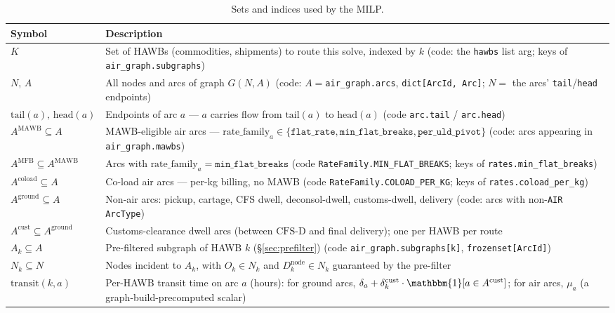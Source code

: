 \documentclass[11pt,a4paper]{article}
\theoremstyle{definition}
\begin{document}
\begin{table}[H]
\centering
\caption{Sets and indices used by the MILP.}
\label{tab:sets-indices}
\begin{tabular}{lp{11.5cm}}
\toprule
Symbol & Description \\
\midrule
$K$ & Set of HAWBs (commodities, shipments) to route this solve, indexed by $k$ (code: the \texttt{hawbs} list arg; keys of \texttt{air\_graph.subgraphs}) \\
$N,\, A$ & All nodes and arcs of graph $G(N,A)$ (code: $A=$\texttt{air\_graph.arcs}, \texttt{dict[ArcId, Arc]}; $N=$ the arcs' \texttt{tail}/\texttt{head} endpoints) \\
$\text{tail}(a),\, \text{head}(a)$ & Endpoints of arc $a$ --- $a$ carries flow from $\text{tail}(a)$ to $\text{head}(a)$ (code \texttt{arc.tail} / \texttt{arc.head}) \\
$A^{\text{MAWB}} \subseteq A$ & MAWB-eligible air arcs --- $\text{rate\_family}_a \in \{\texttt{flat\_rate}, \texttt{min\_flat\_breaks}, \texttt{per\_uld\_pivot}\}$ (code: arcs appearing in \texttt{air\_graph.mawbs}) \\
$A^{\text{MFB}} \subseteq A^{\text{MAWB}}$ & Arcs with $\text{rate\_family}_a = \texttt{min\_flat\_breaks}$ (code \texttt{RateFamily.MIN\_FLAT\_BREAKS}; keys of \texttt{rates.min\_flat\_breaks}) \\
$A^{\text{coload}} \subseteq A$ & Co-load air arcs --- per-kg billing, no MAWB (code \texttt{RateFamily.COLOAD\_PER\_KG}; keys of \texttt{rates.coload\_per\_kg}) \\
$A^{\text{ground}} \subseteq A$ & Non-air arcs: pickup, cartage, CFS dwell, deconsol-dwell, customs-dwell, delivery (code: arcs with non-\texttt{AIR} \texttt{ArcType}) \\
$A^{\text{cust}} \subseteq A^{\text{ground}}$ & Customs-clearance dwell arcs (between $\text{CFS-D}$ and final delivery); one per HAWB per route \\
$A_k \subseteq A$ & Pre-filtered subgraph of HAWB $k$ (\S\ref{sec:prefilter}) (code \texttt{air\_graph.subgraphs[k]}, \texttt{frozenset[ArcId]}) \\
$N_k \subseteq N$ & Nodes incident to $A_k$, with $O_k \in N_k$ and $D_k^{\text{node}} \in N_k$ guaranteed by the pre-filter \\
$\text{transit}(k, a)$ & Per-HAWB transit time on arc $a$ (hours): for ground arcs, $\delta_a + \delta^{\text{cust}}_k \cdot \mathbbm{1}[a \in A^{\text{cust}}]$; for air arcs, $\mu_a$ (a graph-build-precomputed scalar) \\

\end{tabular}
\end{table}
\end{document}
